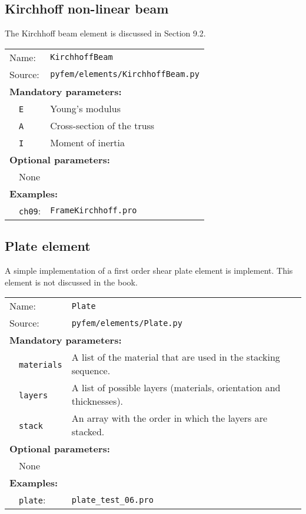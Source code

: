 \documentclass{article}
\begin{document}
\subsection{Kirchhoff non-linear beam}

The Kirchhoff beam element is discussed in Section 9.2.

\vspace{2mm}
\begin{tabular}{p{22mm}p{74mm}}
Name:         & \texttt{KirchhoffBeam} \\
Source:  & \texttt{pyfem/elements/KirchhoffBeam.py} \\
\multicolumn{2}{l}{\textbf{Mandatory parameters:}} \\
~~\texttt{E} & Young's modulus\\
~~\texttt{A} & Cross-section of the truss\\
~~\texttt{I} & Moment of inertia\\
\multicolumn{2}{l}{\textbf{Optional parameters:}} \\ 
~~None  & \\
\multicolumn{2}{l}{\textbf{Examples:}}\\
~~\texttt{ch09}: & \texttt{FrameKirchhoff.pro}
\end{tabular}

\subsection{Plate element}

A simple implementation of a first order shear plate element is implement. This 
element is not discussed in the book.

\vspace{2mm}
\begin{tabular}{p{22mm}p{74mm}}
Name:         & \texttt{Plate} \\
Source:  & \texttt{pyfem/elements/Plate.py} \\
\multicolumn{2}{l}{\textbf{Mandatory parameters:}} \\
~~\texttt{materials} & A list of the material that are used in the stacking sequence.\\
~~\texttt{layers} & A list of possible layers (materials, orientation and thicknesses).\\
~~\texttt{stack} & An array with the order in which the layers are stacked.\\
\multicolumn{2}{l}{\textbf{Optional parameters:}} \\ 
~~None  & \\
\multicolumn{2}{l}{\textbf{Examples:}}\\
~~\texttt{plate}: & \texttt{plate\_test\_06.pro}
\end{tabular}
\end{document}
